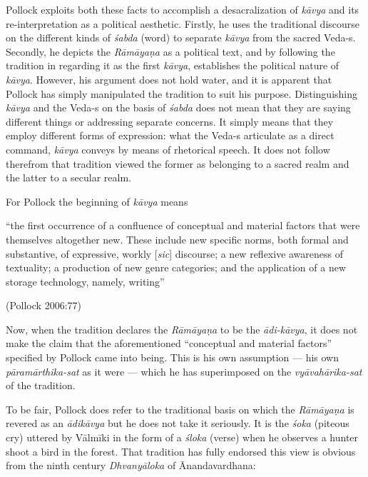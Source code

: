 Pollock exploits both these facts to accomplish a desacralization
 of \textsl{kāvya} and its re-interpretation as a political aesthetic. Firstly, he uses the traditional discourse on the different kinds of \textsl{śabda} (word) to separate \textsl{kāvya} from the sacred Veda-s. Secondly, he depicts the \textsl{Rāmāyaṇa} as a political text, and by following the tradition in regarding it as the first \textsl{kāvya}, establishes the political nature of \textsl{kāvya}. However, his argument does not hold water, and it is apparent that Pollock has simply manipulated the tradition to suit his purpose. Distinguishing \textsl{kāvya} and the Veda-s on the basis of \textsl{śabda} does not mean that they are saying different things or addressing separate concerns. It simply means that they employ different forms of expression: what the \hbox{Veda-s} articulate as a direct command, \textsl{kāvya} conveys by means of rhetorical speech. It does not follow therefrom that tradition viewed the former as belonging to a sacred realm and the latter to a secular realm. 

For Pollock the beginning of \textsl{kāvya} means 

\begin{myquote}
``the first occurrence of a confluence of conceptual and material factors that were themselves altogether new. These include new specific norms, both formal and substantive, of expressive, workly [\textsl{sic}] discourse; a new reflexive awareness of textuality; a production of new genre categories; and the application of a new storage technology, namely, writing'' 

\hfill (Pollock 2006:77) 
\end{myquote}

Now, when the tradition declares the \textsl{Rāmāyaṇa} to be the \textsl{ādi-kāvya}, it does not make the claim that the aforementioned ``conceptual and material factors'' specified by Pollock came into being. This is his own assumption --- his own \textsl{pāramārthika-sat} as it were --- which he has superimposed on the \textsl{vyāvahārika-sat} of the tradition.

To be fair, Pollock does refer to the traditional basis on which the \textsl{Rāmāyaṇa} is revered as an \textsl{ādikāvya} but he does not take it seriously. It is the \textsl{śoka} (piteous cry) uttered by Vālmīki in the form of a \textsl{śloka} (verse) when he observes a hunter shoot a bird in the forest. That tradition has fully endorsed this view is obvious from the ninth century \textsl{Dhvanyāloka} of Ānandavardhana: 


